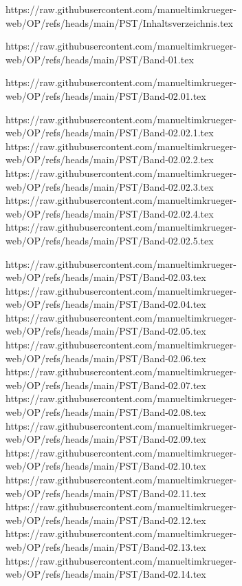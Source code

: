 https://raw.githubusercontent.com/manueltimkrueger-web/OP/refs/heads/main/PST/Inhaltsverzeichnis.tex

https://raw.githubusercontent.com/manueltimkrueger-web/OP/refs/heads/main/PST/Band-01.tex

https://raw.githubusercontent.com/manueltimkrueger-web/OP/refs/heads/main/PST/Band-02.01.tex

https://raw.githubusercontent.com/manueltimkrueger-web/OP/refs/heads/main/PST/Band-02.02.1.tex
https://raw.githubusercontent.com/manueltimkrueger-web/OP/refs/heads/main/PST/Band-02.02.2.tex
https://raw.githubusercontent.com/manueltimkrueger-web/OP/refs/heads/main/PST/Band-02.02.3.tex
https://raw.githubusercontent.com/manueltimkrueger-web/OP/refs/heads/main/PST/Band-02.02.4.tex
https://raw.githubusercontent.com/manueltimkrueger-web/OP/refs/heads/main/PST/Band-02.02.5.tex

https://raw.githubusercontent.com/manueltimkrueger-web/OP/refs/heads/main/PST/Band-02.03.tex
https://raw.githubusercontent.com/manueltimkrueger-web/OP/refs/heads/main/PST/Band-02.04.tex
https://raw.githubusercontent.com/manueltimkrueger-web/OP/refs/heads/main/PST/Band-02.05.tex
https://raw.githubusercontent.com/manueltimkrueger-web/OP/refs/heads/main/PST/Band-02.06.tex
https://raw.githubusercontent.com/manueltimkrueger-web/OP/refs/heads/main/PST/Band-02.07.tex
https://raw.githubusercontent.com/manueltimkrueger-web/OP/refs/heads/main/PST/Band-02.08.tex
https://raw.githubusercontent.com/manueltimkrueger-web/OP/refs/heads/main/PST/Band-02.09.tex
https://raw.githubusercontent.com/manueltimkrueger-web/OP/refs/heads/main/PST/Band-02.10.tex
https://raw.githubusercontent.com/manueltimkrueger-web/OP/refs/heads/main/PST/Band-02.11.tex
https://raw.githubusercontent.com/manueltimkrueger-web/OP/refs/heads/main/PST/Band-02.12.tex
https://raw.githubusercontent.com/manueltimkrueger-web/OP/refs/heads/main/PST/Band-02.13.tex
https://raw.githubusercontent.com/manueltimkrueger-web/OP/refs/heads/main/PST/Band-02.14.tex
